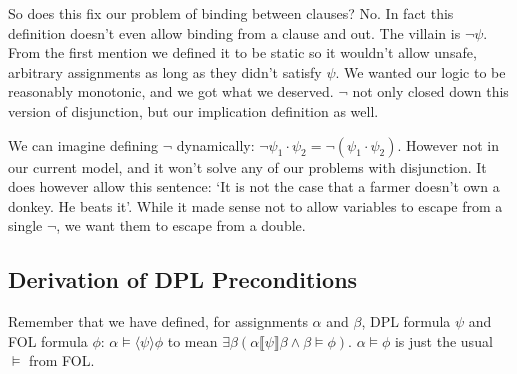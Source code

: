 \documentclass[12pt]{article}
\begin{document}
So does this fix our problem of binding between clauses? No. In fact this definition doesn't even allow binding from a clause and out. The villain is $\neg\psi$. From the first mention we defined it to be static so it wouldn't allow unsafe, arbitrary assignments as long as they didn't satisfy $\psi$. We wanted our logic to be reasonably monotonic, and we got what we deserved. $\neg$ not only closed down this version of disjunction, but our implication definition as well.

We can imagine defining $\neg$ dynamically: $\neg\psi_1\cdot\psi_2 = \neg(\psi_1\cdot\psi_2)$. However not in our current model, and it won't solve any of our problems with disjunction. It does however allow this sentence: `It is not the case that a farmer doesn't own a donkey. He beats it'. While it made sense not to allow variables to escape from a single $\neg$, we want them to escape from a double.

\subsection{Derivation of DPL Preconditions}\label{sec:derivation_dpl}
Remember that we have defined, for assignments $\alpha$ and $\beta$, DPL formula $\psi$ and FOL formula $\phi$: $\alpha\models\langle\psi\rangle\phi$ to mean $\exists\beta(\alpha\llbracket\psi\rrbracket\beta\wedge\beta\models\phi)$. $\alpha\models\phi$ is just the usual $\models$ from FOL.
\end{document}
